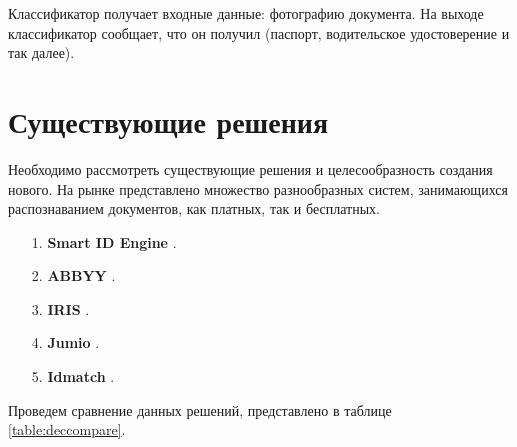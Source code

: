 Классификатор получает входные данные: фотографию документа. На выходе классификатор сообщает, что он получил (паспорт, водительское удостоверение и так далее).

\section{Существующие решения}

Необходимо рассмотреть существующие решения и целесообразность создания нового. На рынке представлено множество разнообразных систем, занимающихся распознаванием документов, как платных, так и бесплатных.

\begin{enumerate}
\item[1.] \textbf{Smart ID Engine} \cite{smartengine}.

\item[2.] \textbf{ABBYY} \cite{abbyy}.

\item[3.] \textbf{IRIS} \cite{iris}.

\item[4.] \textbf{Jumio} \cite{jumio}.

\item[5.] \textbf{Idmatch} \cite{idmatch}.
\end{enumerate}

Проведем сравнение данных решений, представлено в таблице \ref{table:deccompare}.

